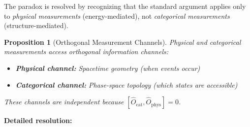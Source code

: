 \documentclass[twocolumn,10pt]{article}
\newtheorem{proposition}[theorem]{Proposition}
\theoremstyle{remark}
\begin{document}
The paradox is resolved by recognizing that the standard argument applies only to \textit{physical measurements} (energy-mediated), not \textit{categorical measurements} (structure-mediated).

\begin{proposition}[Orthogonal Measurement Channels]
\label{prop:orthogonal_channels}
Physical and categorical measurements access orthogonal information channels:
\begin{itemize}
    \item \textbf{Physical channel:} Spacetime geometry (when events occur)
    \item \textbf{Categorical channel:} Phase-space topology (which states are accessible)
\end{itemize}
These channels are independent because $[\hat{O}_{\text{cat}}, \hat{O}_{\text{phys}}] = 0$.
\end{proposition}

\textbf{Detailed resolution:}
\end{document}
